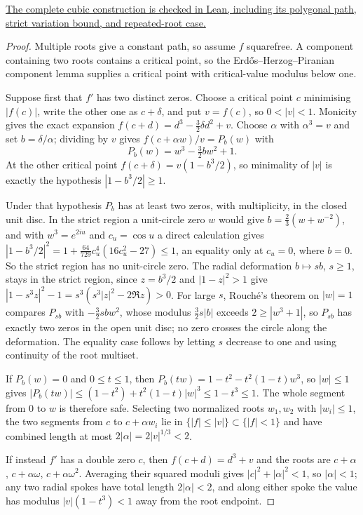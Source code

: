 \noindent\href{https://github.com/wcook04/plectis-erdos/blob/bb4e24651b37cd096d3749ef299c3317930b3a3b/ErdosProblems/Erdos1041/PaperCubicCompletion.lean#L297}{The complete cubic construction is checked in Lean, including its polygonal path, strict variation bound, and repeated-root case.}


\begin{proof}
Multiple roots give a constant path, so assume $f$ squarefree.  A component
containing two roots contains a critical point, so the
Erd\H{o}s--Herzog--Piranian component lemma \cite[p.~139]{ehp1958} supplies a
critical point with critical-value modulus below one.

Suppose first that $f'$ has two distinct zeros.  Choose a critical point $c$
minimising $|f(c)|$, write the other one as $c+\delta$, and put $v=f(c)$, so
$0<|v|<1$.  Monicity gives the exact expansion
$f(c+d)=d^3-\tfrac32\delta d^2+v$.  Choose $\alpha$ with $\alpha^3=v$ and set
$b=\delta/\alpha$; dividing by $v$ gives
$f(c+\alpha w)/v=P_b(w)$ with
\[
 P_b(w)=w^3-\tfrac32bw^2+1 .
\]
At the other critical point $f(c+\delta)=v(1-b^3/2)$, so minimality of $|v|$
is exactly the hypothesis $|1-b^3/2|\ge1$.

Under that hypothesis $P_b$ has at least two zeros, with multiplicity, in the
closed unit disc.  In the strict region a unit-circle zero $w$ would give
$b=\tfrac23(w+w^{-2})$, and with $w^3=e^{2iu}$ and $c_u=\cos u$ a direct
calculation gives $|1-b^3/2|^2=1+\tfrac{64}{729}c_u^4(16c_u^2-27)\le1$, an
equality only at $c_u=0$, where $b=0$.  So the strict region has no
unit-circle zero.  The radial deformation $b\mapsto sb$, $s\ge1$, stays in
the strict region, since $z=b^3/2$ and $|1-z|^2>1$ give
$|1-s^3z|^2-1=s^3(s^3|z|^2-2\Re z)>0$.  For large $s$, Rouch\'e's theorem on
$|w|=1$ compares $P_{sb}$ with $-\tfrac32sbw^2$, whose modulus
$\tfrac32s|b|$ exceeds $2\ge|w^3+1|$, so $P_{sb}$ has exactly two zeros in
the open unit disc; no zero crosses the circle along the deformation.  The
equality case follows by letting $s$ decrease to one and using continuity of
the root multiset.

If $P_b(w)=0$ and $0\le t\le1$, then
$P_b(tw)=1-t^2-t^2(1-t)w^3$, so $|w|\le1$ gives
$|P_b(tw)|\le(1-t^2)+t^2(1-t)|w|^3\le1-t^3\le1$.  The whole segment from $0$
to $w$ is therefore safe.  Selecting two normalized roots $w_1,w_2$ with
$|w_i|\le1$, the two segments from $c$ to $c+\alpha w_i$ lie in
$\{|f|\le|v|\}\subset\{|f|<1\}$ and have combined length at most
$2|\alpha|=2|v|^{1/3}<2$.

If instead $f'$ has a double zero $c$, then $f(c+d)=d^3+v$ and the roots are
$c+\alpha$, $c+\alpha\omega$, $c+\alpha\omega^2$.  Averaging their squared
moduli gives $|c|^2+|\alpha|^2<1$, so $|\alpha|<1$; any two radial spokes
have total length $2|\alpha|<2$, and along either spoke the value has modulus
$|v|(1-t^3)<1$ away from the root endpoint.
\end{proof}

